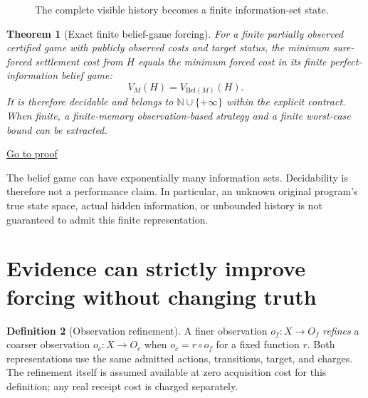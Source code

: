 \documentclass[11pt,letterpaper]{article}
\newtheorem{theorem}{Theorem}[section]
\theoremstyle{definition}
\newtheorem{definition}[theorem]{Definition}
\theoremstyle{remark}
\newcommand{\N}{\mathbb{N}}
\newcommand{\backproof}[1]{\hfill\hyperlink{proof:#1}{\footnotesize Go to proof}}
\begin{document}
\begin{figure}[ht]
\centering{}
\caption{The complete visible history becomes a finite information-set state.}
\end{figure}

\begin{theorem}[Exact finite belief-game forcing]\label{thm:belief}\hypertarget{stmt:belief}{}
For a finite partially observed certified game with publicly observed costs and target status, the minimum sure-forced settlement cost from $H$ equals the minimum forced cost in its finite perfect-information belief game:
\[
\boxed{V_M(H)=V_{\mathrm{Bel}(M)}(H).}
\]
It is therefore decidable and belongs to $\N\cup\{+\infty\}$ within the explicit contract. When finite, a finite-memory observation-based strategy and a finite worst-case bound can be extracted.
\end{theorem}\backproof{belief}

The belief game can have exponentially many information sets. Decidability is therefore not a performance claim. In particular, an unknown original program's true state space, actual hidden information, or unbounded history is not guaranteed to admit this finite representation.

\section{Evidence can strictly improve forcing without changing truth}
\begin{definition}[Observation refinement]
A finer observation $o_f:X\to O_f$ \emph{refines} a coarser observation $o_c:X\to O_c$ when $o_c=r\circ o_f$ for a fixed function $r$. Both representations use the same admitted actions, transitions, target, and charges. The refinement itself is assumed available at zero acquisition cost for this definition; any real receipt cost is charged separately.
\end{definition}
\end{document}
